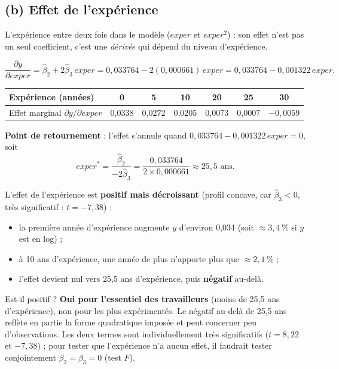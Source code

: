 \documentclass[11pt,a4paper]{article}
\begin{document}
\subsection*{(b) Effet de l'expérience}

\begin{idee}
L'expérience entre deux fois dans le modèle ($exper$ et $exper^2$) : son effet n'est pas un seul coefficient, c'est une \emph{dérivée} qui dépend du niveau d'expérience.
\end{idee}

\[
\frac{\partial y}{\partial exper}=\hat\beta_2+2\hat\beta_3\,exper=0{,}033764-2(0{,}000661)\,exper=0{,}033764-0{,}001322\,exper .
\]

\begin{center}
\renewcommand{\arraystretch}{1.25}
\begin{tabular}{@{}lcccccc@{}}
\toprule
Expérience (années) & 0 & 5 & 10 & 20 & 25 & 30 \\
\midrule
Effet marginal $\partial y/\partial exper$ & 0,0338 & 0,0272 & 0,0205 & 0,0073 & 0,0007 & $-0{,}0059$ \\
\bottomrule
\end{tabular}
\end{center}

\textbf{Point de retournement} : l'effet s'annule quand $0{,}033764-0{,}001322\,exper=0$, soit
\[
exper^*=\frac{\hat\beta_2}{-2\hat\beta_3}=\frac{0{,}033764}{2\times0{,}000661}\approx25{,}5\text{ ans}.
\]

\begin{reponse}
L'effet de l'expérience est \textbf{positif mais décroissant} (profil concave, car $\hat\beta_3<0$, très significatif : $t=-7{,}38$) :
\begin{itemize}[nosep]
\item la première année d'expérience augmente $y$ d'environ 0,034 (soit $\approx3{,}4\,\%$ si $y$ est en log) ;
\item à 10 ans d'expérience, une année de plus n'apporte plus que $\approx2{,}1\,\%$ ;
\item l'effet devient nul vers 25,5 ans d'expérience, puis \textbf{négatif} au-delà.
\end{itemize}
Est-il positif ? \textbf{Oui pour l'essentiel des travailleurs} (moins de 25,5 ans d'expérience), non pour les plus expérimentés. Le négatif au-delà de 25,5 ans reflète en partie la forme quadratique imposée et peut concerner peu d'observations. Les deux termes sont individuellement très significatifs ($t=8{,}22$ et $-7{,}38$) ; pour tester que l'expérience n'a aucun effet, il faudrait tester conjointement $\beta_2=\beta_3=0$ (test $F$).
\end{reponse}
\end{document}

